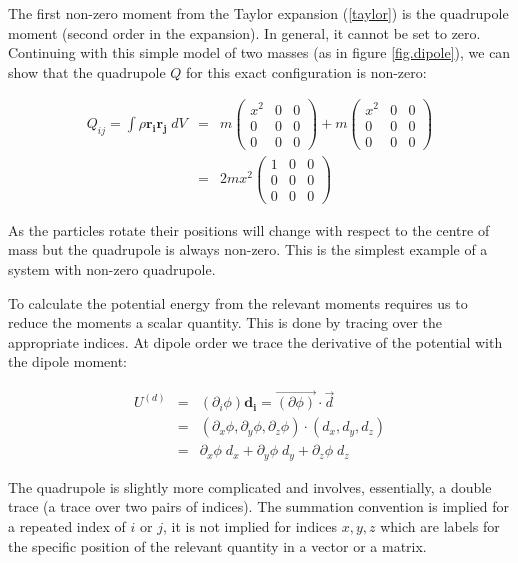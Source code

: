 \noindent The first non-zero moment from the Taylor expansion (\ref{taylor}) is the quadrupole moment (second order in the expansion). In general, it cannot be set to zero. Continuing with this simple model of two masses (as in figure \ref{fig.dipole}), we can show that the quadrupole $Q$ for this exact configuration is non-zero:

\begin{eqnarray}
Q_{ij} = \int \rho \mathbf{r_i} \mathbf{r_j}\;dV &=& m\left(\begin{array}{ccc}
x^2 & 0 & 0 \\
0 & 0 & 0 \\
0 & 0 & 0
\end{array}\right)
+ m\left(\begin{array}{ccc}
x^2 & 0 & 0 \\
0 & 0 & 0 \\
0 & 0 & 0
\end{array}\right) \\
&=&  2m x^2\left(\begin{array}{ccc}
1 & 0 & 0 \\
0 & 0 & 0 \\
0 & 0 & 0
\end{array}\right)
\end{eqnarray}

\noindent As the particles rotate their positions will change with respect to the centre of mass but the quadrupole is always non-zero. This is the simplest example of a system with non-zero quadrupole.

To calculate the potential energy from the relevant moments requires us to reduce the moments a scalar quantity. This is done by tracing over the appropriate indices. At dipole order we trace the derivative of the potential with the dipole moment:

\begin{eqnarray}
U^{(d)} &=& (\partial_i \phi) \mathbf{d_i} = \vec{(\partial \phi)}\cdot\vec{d} \\
&=& (\partial_x \phi, \partial_y \phi, \partial_z \phi)\cdot(d_x, d_y, d_z) \\
&=& \partial_x \phi \; d_x + \partial_y \phi\; d_y + \partial_z \phi\; d_z
\end{eqnarray}

\noindent The quadrupole is slightly more complicated and involves, essentially, a double trace (a trace over two pairs of indices). The summation convention is implied for a repeated index of $i$ or $j$, it is not implied for indices $x, y, z$ which are labels for the specific position of the relevant quantity in a vector or a matrix.

